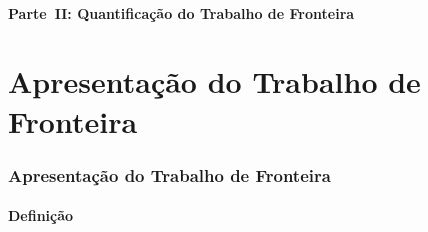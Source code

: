 
\subsection{Parte~II: Quantificação do Trabalho de Fronteira}


\part{Apresentação do Trabalho de Fronteira}
\frame{\partpage}

\section{Apresentação do Trabalho de Fronteira}

\subsection{Definição}

